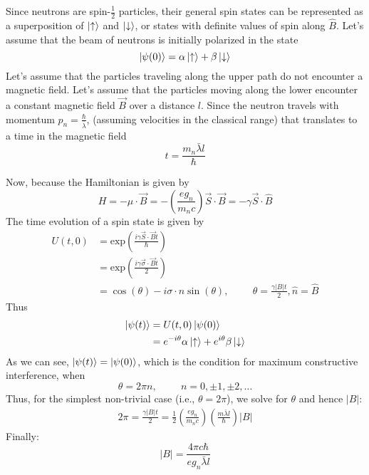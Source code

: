 \documentclass[12pt, letterpaper]{article}
\begin{document}
\begin{enumerate}
    Since neutrons are spin-$\frac{1}{2}$ particles, their general spin states can be represented as a superposition of $\ket{\uparrow}$ and $\ket{\downarrow}$, or states with definite values of spin along $\hat{B}$. Let's assume that the beam of neutrons is initially polarized in the state
    \begin{equation}
        \ket{\psi(0)}=\alpha\ket{\uparrow}+\beta\ket{\downarrow}
    \end{equation}
    Let's assume that the particles traveling along the upper path do not encounter a magnetic field. Let's assume that the particles moving along the lower encounter a constant magnetic field $\vec{B}$ over a distance $l$. Since the neutron travels with momentum $p_n=\frac{\hbar}{\bar{\lambda}}$, (assuming velocities in the classical range) that translates to a time in the magnetic field
    \begin{equation}
        t=\frac{m_n\bar{\lambda}l}{\hbar }
    \end{equation}
    
    Now, because the Hamiltonian is given by
    \begin{equation}
        H=-\mu \cdot \vec{B}=-\left(\frac{e g_n}{m_nc}\right)\vec{S}\cdot \vec{B}=-\gamma \vec{S}\cdot \hat{B}
    \end{equation}
    The time evolution of a spin state is given by
    \begin{align}
        U(t,0)&=\text{exp}\left(\frac{i\gamma\vec{S}\cdot \vec{B}t}{\hbar}\right)\\&=\text{exp}\left(\frac{i\gamma \vec{\sigma}\cdot \vec{B}t}{2}\right)\\&=\cos\left(\theta\right)-i\sigma \cdot \hat{n}\sin(\theta),\hspace{1cm}\theta=\frac{\gamma|B|t}{2},\hat{n}=\hat{B}
    \end{align}
    Thus
    \begin{align}
        \ket{\psi(t)}&=U(t,0)\ket{\psi(0)}\\&=e^{-i\theta}\alpha\ket{\uparrow}+e^{i\theta}\beta \ket{\downarrow}
    \end{align}
    As we can see, $\ket{\psi(t)}=\ket{\psi(0)}$, which is the condition for maximum constructive interference, when 
    \begin{equation}
        \theta=2\pi n,\hspace{1cm}n=0,\pm 1,\pm2,\ldots
    \end{equation}
    Thus, for the simplest non-trivial case (i.e., $\theta=2\pi$), we solve for $\theta$ and hence $|B|$:
    \begin{align}
        2\pi=\frac{\gamma |B|t}{2}=\frac{1}{2}\left(\frac{e g_n}{m_nc}\right)\left(\frac{m\bar{\lambda}l}{\hbar}\right)|B|
    \end{align}
    Finally:
    \begin{equation}
        \boxed{|B|=\frac{4\pi c\hbar}{eg_n\bar{\lambda}l}}
    \end{equation}
    

\end{enumerate}
\end{document}
